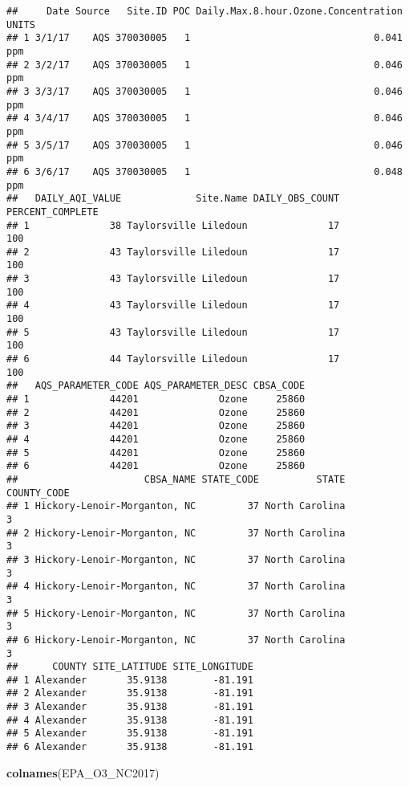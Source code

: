 \documentclass[]{article}
\newenvironment{Shaded}{\begin{snugshade}}{\end{snugshade}}
\newcommand{\KeywordTok}[1]{\textcolor[rgb]{0.13,0.29,0.53}{\textbf{#1}}}
\newcommand{\NormalTok}[1]{#1}
\begin{document}
\begin{verbatim}
##     Date Source   Site.ID POC Daily.Max.8.hour.Ozone.Concentration UNITS
## 1 3/1/17    AQS 370030005   1                                0.041   ppm
## 2 3/2/17    AQS 370030005   1                                0.046   ppm
## 3 3/3/17    AQS 370030005   1                                0.046   ppm
## 4 3/4/17    AQS 370030005   1                                0.046   ppm
## 5 3/5/17    AQS 370030005   1                                0.046   ppm
## 6 3/6/17    AQS 370030005   1                                0.048   ppm
##   DAILY_AQI_VALUE             Site.Name DAILY_OBS_COUNT PERCENT_COMPLETE
## 1              38 Taylorsville Liledoun              17              100
## 2              43 Taylorsville Liledoun              17              100
## 3              43 Taylorsville Liledoun              17              100
## 4              43 Taylorsville Liledoun              17              100
## 5              43 Taylorsville Liledoun              17              100
## 6              44 Taylorsville Liledoun              17              100
##   AQS_PARAMETER_CODE AQS_PARAMETER_DESC CBSA_CODE
## 1              44201              Ozone     25860
## 2              44201              Ozone     25860
## 3              44201              Ozone     25860
## 4              44201              Ozone     25860
## 5              44201              Ozone     25860
## 6              44201              Ozone     25860
##                      CBSA_NAME STATE_CODE          STATE COUNTY_CODE
## 1 Hickory-Lenoir-Morganton, NC         37 North Carolina           3
## 2 Hickory-Lenoir-Morganton, NC         37 North Carolina           3
## 3 Hickory-Lenoir-Morganton, NC         37 North Carolina           3
## 4 Hickory-Lenoir-Morganton, NC         37 North Carolina           3
## 5 Hickory-Lenoir-Morganton, NC         37 North Carolina           3
## 6 Hickory-Lenoir-Morganton, NC         37 North Carolina           3
##      COUNTY SITE_LATITUDE SITE_LONGITUDE
## 1 Alexander       35.9138        -81.191
## 2 Alexander       35.9138        -81.191
## 3 Alexander       35.9138        -81.191
## 4 Alexander       35.9138        -81.191
## 5 Alexander       35.9138        -81.191
## 6 Alexander       35.9138        -81.191
\end{verbatim}

\begin{Shaded}
\begin{Highlighting}[]
\KeywordTok{colnames}\NormalTok{(EPA_O3_NC2017)}
\end{Highlighting}
\end{Shaded}
\end{document}
